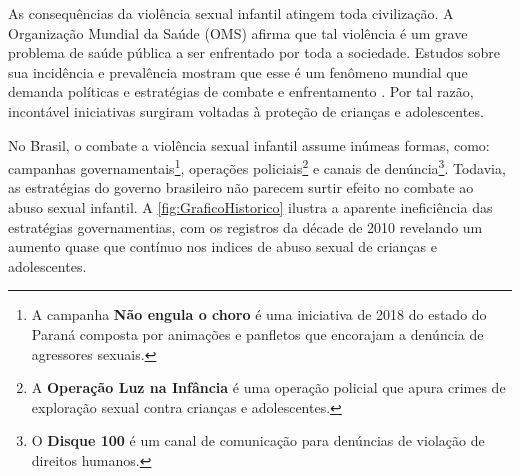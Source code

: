 
As consequências da violência sexual infantil atingem toda civilização. A Organização Mundial da Saúde (OMS) afirma que tal violência é um grave problema de saúde pública a ser enfrentado por toda a sociedade. Estudos  sobre  sua  incidência  e   prevalência  mostram  que  esse  é  um fenômeno  mundial que demanda políticas e estratégias de combate e enfrentamento \cite{pinto2017avaliaccao}. Por tal razão, incontável iniciativas surgiram voltadas à proteção de crianças e adolescentes.




No Brasil, o combate a violência sexual infantil assume inúmeas formas, como: campanhas governamentais\footnote{A campanha \textbf{Não engula o choro} é uma iniciativa de 2018 do estado do Paraná composta por animações e panfletos que encorajam a denúncia de agressores sexuais.}, operações policiais\footnote{A \textbf{Operação Luz na Infância} é uma operação policial que apura crimes de exploração sexual contra crianças e adolescentes.} e canais de denúncia\footnote{O \textbf{Disque 100} é um canal de comunicação para denúncias de violação de direitos humanos.}. Todavia, as estratégias do governo brasileiro não parecem surtir efeito no combate ao abuso sexual infantil. A \autoref{fig:GraficoHistorico} ilustra a aparente ineficiência das estratégias governamentias, com os registros da décade de 2010 revelando um aumento quase que contínuo nos indices de abuso sexual de crianças e adolescentes.

